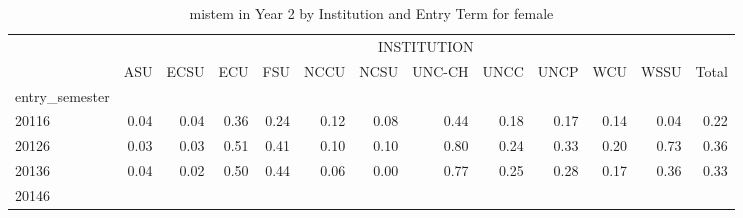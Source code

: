 \begin{table}[!h]
\caption{mistem in Year 2 by Institution and Entry Term for female}
\centering
\begin{tabular}{lllllllllllll}
\cline{1-13}
\multicolumn{1}{c}{} &
  \multicolumn{12}{|c}{INSTITUTION} \\
\multicolumn{1}{c}{} &
  \multicolumn{1}{|r}{ASU} &
  \multicolumn{1}{r}{ECSU} &
  \multicolumn{1}{r}{ECU} &
  \multicolumn{1}{r}{FSU} &
  \multicolumn{1}{r}{NCCU} &
  \multicolumn{1}{r}{NCSU} &
  \multicolumn{1}{r}{UNC-CH} &
  \multicolumn{1}{r}{UNCC} &
  \multicolumn{1}{r}{UNCP} &
  \multicolumn{1}{r}{WCU} &
  \multicolumn{1}{r}{WSSU} &
  \multicolumn{1}{r}{Total} \\
\cline{1-13}
\multicolumn{1}{l}{entry\_semester} &
  \multicolumn{1}{|r}{} &
  \multicolumn{1}{r}{} &
  \multicolumn{1}{r}{} &
  \multicolumn{1}{r}{} &
  \multicolumn{1}{r}{} &
  \multicolumn{1}{r}{} &
  \multicolumn{1}{r}{} &
  \multicolumn{1}{r}{} &
  \multicolumn{1}{r}{} &
  \multicolumn{1}{r}{} &
  \multicolumn{1}{r}{} &
  \multicolumn{1}{r}{} \\
\multicolumn{1}{l}{\hspace{1em}20116} &
  \multicolumn{1}{|r}{0.04} &
  \multicolumn{1}{r}{0.04} &
  \multicolumn{1}{r}{0.36} &
  \multicolumn{1}{r}{0.24} &
  \multicolumn{1}{r}{0.12} &
  \multicolumn{1}{r}{0.08} &
  \multicolumn{1}{r}{0.44} &
  \multicolumn{1}{r}{0.18} &
  \multicolumn{1}{r}{0.17} &
  \multicolumn{1}{r}{0.14} &
  \multicolumn{1}{r}{0.04} &
  \multicolumn{1}{r}{0.22} \\
\multicolumn{1}{l}{\hspace{1em}20126} &
  \multicolumn{1}{|r}{0.03} &
  \multicolumn{1}{r}{0.03} &
  \multicolumn{1}{r}{0.51} &
  \multicolumn{1}{r}{0.41} &
  \multicolumn{1}{r}{0.10} &
  \multicolumn{1}{r}{0.10} &
  \multicolumn{1}{r}{0.80} &
  \multicolumn{1}{r}{0.24} &
  \multicolumn{1}{r}{0.33} &
  \multicolumn{1}{r}{0.20} &
  \multicolumn{1}{r}{0.73} &
  \multicolumn{1}{r}{0.36} \\
\multicolumn{1}{l}{\hspace{1em}20136} &
  \multicolumn{1}{|r}{0.04} &
  \multicolumn{1}{r}{0.02} &
  \multicolumn{1}{r}{0.50} &
  \multicolumn{1}{r}{0.44} &
  \multicolumn{1}{r}{0.06} &
  \multicolumn{1}{r}{0.00} &
  \multicolumn{1}{r}{0.77} &
  \multicolumn{1}{r}{0.25} &
  \multicolumn{1}{r}{0.28} &
  \multicolumn{1}{r}{0.17} &
  \multicolumn{1}{r}{0.36} &
  \multicolumn{1}{r}{0.33} \\
\multicolumn{1}{l}{\hspace{1em}20146} &

\end{tabular}
\end{table}
